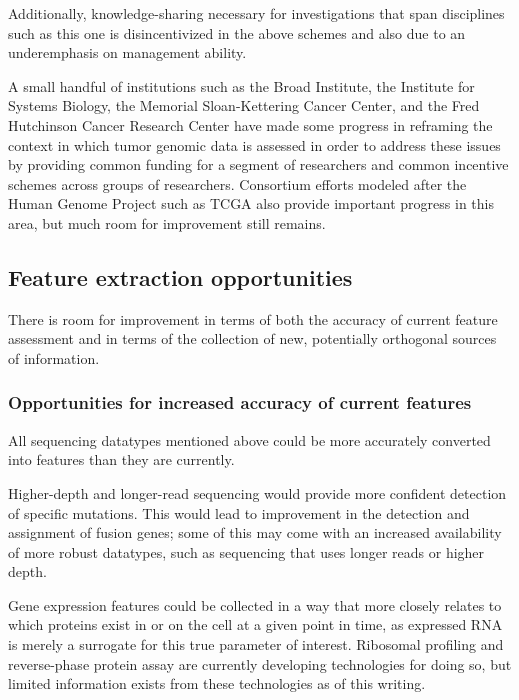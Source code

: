 Additionally, knowledge-sharing necessary for investigations that span disciplines such as this one is disincentivized in the above schemes and also due to an underemphasis on management ability. 

A small handful of institutions such as the Broad Institute, the Institute for Systems Biology, the Memorial Sloan-Kettering Cancer Center, and the Fred Hutchinson Cancer Research Center have made some progress in reframing the context in which tumor genomic data is assessed in order to address these issues by providing common funding for a segment of researchers and common incentive schemes across groups of researchers. Consortium efforts modeled after the Human Genome Project\cite{lander_initial_2001} such as TCGA also provide important progress in this area, but much room for improvement still remains. 

\subsection{Feature extraction opportunities}

There is room for improvement in terms of both the accuracy of current feature
assessment and in terms of the collection of new, potentially orthogonal sources of information.

\subsubsection{Opportunities for increased accuracy of current features}

All sequencing datatypes mentioned above could be more accurately converted into features than they are currently. 

Higher-depth and longer-read sequencing would provide more confident detection of specific mutations.  This would lead to improvement in the detection and assignment of fusion genes; some of this may come with an increased availability of more robust datatypes, such as sequencing that uses longer reads or higher depth. 

Gene expression features could be collected in a way that more closely relates to which proteins exist in or on the cell at a given point in time, as expressed RNA is merely a surrogate for this true parameter of interest. Ribosomal profiling\cite{ingolia_genome-wide_2009} and reverse-phase protein assay\cite{tibes_reverse_2006} are currently developing technologies for doing so, but limited information exists from these technologies as of this writing. 


